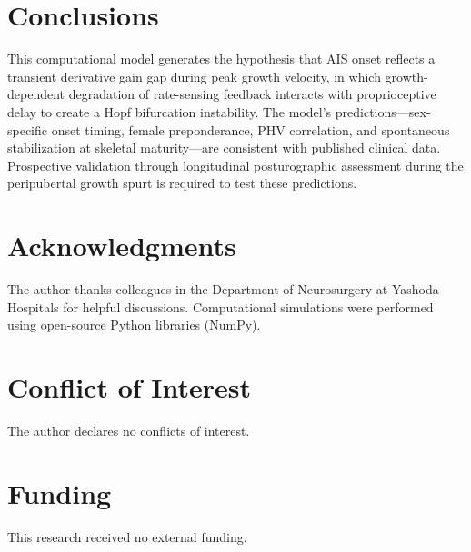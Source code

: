 \documentclass[12pt,a4paper]{article}
\begin{document}
\section{Conclusions}

This computational model generates the hypothesis that AIS onset reflects a transient derivative gain gap during peak growth velocity, in which growth-dependent degradation of rate-sensing feedback interacts with proprioceptive delay to create a Hopf bifurcation instability. The model's predictions---sex-specific onset timing, female preponderance, PHV correlation, and spontaneous stabilization at skeletal maturity---are consistent with published clinical data. Prospective validation through longitudinal posturographic assessment during the peripubertal growth spurt is required to test these predictions.

\section*{Acknowledgments}

The author thanks colleagues in the Department of Neurosurgery at Yashoda Hospitals for helpful discussions. Computational simulations were performed using open-source Python libraries (NumPy).

\section*{Conflict of Interest}

The author declares no conflicts of interest.

\section*{Funding}

This research received no external funding.
\end{document}
